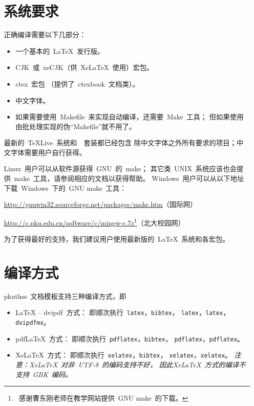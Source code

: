 	\section{系统要求}

	正确编译需要以下几部分：
	\begin{itemize}\denselist
		\item 一个基本的~\LaTeX{}~发行版。
		\item CJK~或~xeCJK（供~Xe\LaTeX{}~使用）宏包。
		\item ctex~宏包\supercite{ctex-doc,ctexfaq}%
			（提供了~ctexbook~文档类）。
		\item 中文字体。
		\item 如果需要使用~Makefile~来实现自动编译，还需要~Make~工具；
			但如果使用由批处理实现的伪“Makefile”就不用了。
	\end{itemize}

	最新的~\TeX{}Live~系统和~\CTeX~套装都已经包含%
	除中文字体之外所有要求的项目；中文字体需要用户自行获得。

	Linux~用户可以从软件源获得~GNU~的~make；
	其它类~UNIX~系统应该也会提供~make~工具，请参阅相应的文档以获得帮助。
	Windows~用户可以从以下地址下载~Windows~下的~GNU make~工具：

	\url{http://gnuwin32.sourceforge.net/packages/make.htm}（国际网）
	\vspace{-0.1em}\par
	\url{http://c.pku.edu.cn/software/c/mingw-c.7z}\footnote%
	{\ 感谢曹东刚老师在教学网站提供~GNU make~的下载。}（北大校园网）

	为了获得最好的支持，我们建议用户使用最新版的~\LaTeX{}~系统和各宏包。

	\section{编译方式}

	pkuthss~文档模板支持三种编译方式，即
	\begin{itemize}\denselist
	  \item \LaTeX{} -- dvipdf~方式：
		即顺次执行~\verb|latex|，\verb|bibtex|，%
		\verb|latex|，\verb|latex|，\verb|dvipdfmx|。
	  \item pdf\LaTeX{}~方式：
		即顺次执行~\verb|pdflatex|，\verb|bibtex|，%
		\verb|pdflatex|，\verb|pdflatex|。
	  \item Xe\LaTeX{}~方式：
		即顺次执行~\verb|xelatex|，\verb|bibtex|，%
		\verb|xelatex|，\verb|xelatex|。%
		\emph
		{%
			注意：Xe\LaTeX{}~对非~UTF-8~的编码支持不好，
			因此Xe\LaTeX{}~方式的编译不支持~GBK~编码。
		}
	\end{itemize}

